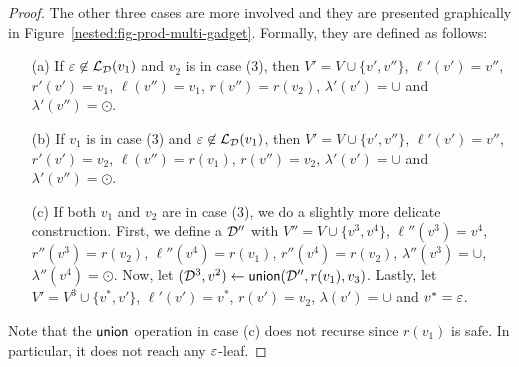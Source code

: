 \begin{proof}


The other three cases are more involved and they are presented graphically in Figure~\ref{nested:fig-prod-multi-gadget}. 
Formally, they are defined as follows:
\begin{itemize}
	\item[(a)] If $\varepsilon\not\in\mathcal{L}_{\mathcal{D}}(v_1)$ and $v_2$ is in case (3), then $V' = V\cup\{v',v''\}$, $\ell'(v') = v''$, $r'(v') = v_1$, $\ell(v'') = v_1$,  $r(v'') = r(v_2)$, $\lambda'(v') = \cup$ and $\lambda'(v'') = \odot$. 
	\item[(b)] If $v_1$ is in case (3) and $\varepsilon\not\in\mathcal{L}_{\mathcal{D}}(v_1)$, then $V' = V\cup\{v',v''\}$,  $\ell'(v') = v''$, $r'(v') = v_2$, $\ell(v'') = r(v_1)$,  $r(v'') = v_2$, $\lambda'(v') = \cup$ and $\lambda'(v'') = \odot$. 
	\item[(c)] If both $v_1$ and $v_2$ are in case (3), we do a slightly more delicate construction. 
	First, we define a $\mathcal{D}''$ with $V'' = V\cup\{v^{3},v^{4}\}$, $\ell''(v^3) = v^4$, $r''(v^3) = r(v_2)$, $\ell''(v^4) = r(v_1)$, $r''(v^4) = r(v_2)$, $\lambda''(v^3) = \cup$, $\lambda''(v^4) = \odot$.
	Now, let $(\mathcal{D}^3, v^2) \gets \mathsf{union}(\mathcal{D}'', r(v_1), v_3)$.
	Lastly, let $V' = V^3 \cup \{v^{*}, v'\}$, $\ell'(v') = v^*$, $r(v') = v_2$, $\lambda(v') = \cup$ and $v^* = \varepsilon$.
\end{itemize}
Note that the $\mathsf{union}$ operation in case (c) does not recurse since $r(v_1)$ is safe. In particular, it does not reach any $\varepsilon$-leaf.


\end{proof}
